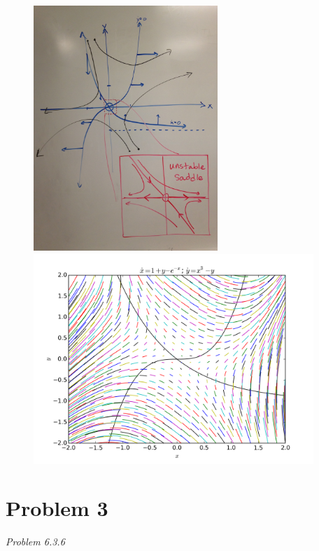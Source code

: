 \documentclass[12pt]{article}
\begin{document}
\begin{figure}[ht]
    \centering
    \includegraphics[height=350px]{figures/2_drawing.jpg}
    \includegraphics[width=400px]{figures/2_simulation.png}
\end{figure}

\FloatBarrier
\section*{Problem 3}
\emph{Problem 6.3.6}
\end{document}
